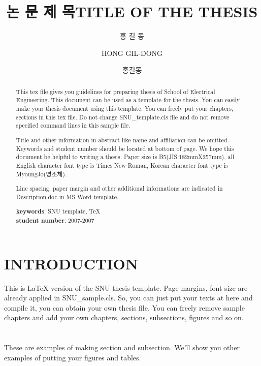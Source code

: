 \documentclass[doctor]{snuee}
\title[korean]{논 문 제 목}
\title[english]{TITLE OF THE THESIS}
\author[korean]{홍 길 동}
\author[english]{HONG GIL-DONG}
\author[nospace]{홍길동}
\begin{document}
\renewcommand{\baselinestretch}{1.5}    %
\selectfont                             %

\begin{abstract}
	\par %
	This tex file gives you guidelines for preparing thesis of School of Electrical Engineering.
	This document can be used as a template for the thesis.
	You can easily make your thesis document using this template. You can freely put your chapters,
	sections in this tex file.
	Do not change SNU\_template.cls file and do not remove specified
	command lines in this sample file.
	
	Title and other information in abstract like name and affiliation can be
	omitted. Keywords and student number should be located at bottom of
	page. We hope this document be helpful to writing a thesis. Paper
	size is B5(JIS:182mmX257mm), all English character font type is
	Times New Roman, Korean character font type is MyoungJo(명조체).
	
	Line spacing, paper margin and other additional informations are
	indicated in Description.doc in MS Word template.
	
	\vfill
	\begin{minipage}[t][20mm][b]{\textwidth}
		{\bfseries keywords}: SNU template, TeX\\
		{\bfseries student number}: 2007-2007\\
	\end{minipage}
	
\end{abstract}

\changepage{5mm}{}{}{}{}{}{}{}{-5mm}    %
\makelists   %


%
\chapter{INTRODUCTION}
This is LaTeX version of the SNU thesis template. Page margins, font size are already applied in SNU\_sample.cls.
So, you can just put your texts at here and compile it, you can
obtain your own thesis file.
You can freely remove sample chapters and add your own chapters,
sections, subsections, figures and so on.
\\
\\
\\
These are examples of making section and subsection.
We'll show you other examples of putting your figures and
tables.
\end{document}
